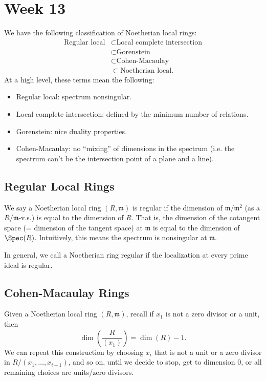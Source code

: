 \section{Week 13}
We have the following classification of Noetherian local rings:
\[
    \begin{split}
        \text{Regular local} & \subset \text{Local complete intersection} \\
                             & \subset \text{Gorenstein}                  \\
                             & \subset \text{Cohen-Macaulay}              \\
                             & \subset \text{Noetherian local}.
    \end{split}
\]
At a high level, these terms mean the following:
\begin{itemize}
    \item Regular local: spectrum nonsingular.
    \item Local complete intersection: defined by the minimum number of relations.
    \item Gorenstein: nice duality properties.
    \item Cohen-Macaulay: no ``mixing'' of dimensions in the spectrum (i.e. the spectrum can't be the intersection point of a plane and a line).
\end{itemize}

\subsection{Regular Local Rings}
We say a Noetherian local ring $(R, \mathfrak m)$ is regular if the dimension of $\mathfrak m/\mathfrak m^2$ (as a $R/\mathfrak m$-v.s.) is equal to the dimension of $R$. That is, the dimension of the cotangent space (= dimension of the tangent space) at $\mathfrak m$ is equal to the dimension of $\Spec(R)$. Intuitively, this means the spectrum is nonsingular at $\mathfrak m$.

In general, we call a Noetherian ring regular if the localization at every prime ideal is regular.

\subsection{Cohen-Macaulay Rings}
Given a Noetherian local ring $(R, \mathfrak m)$, recall if $x_1$ is not a zero divisor or a unit, then
\[
    \dim\left( \frac{R}{(x_1)} \right) = \dim(R) - 1.
\]
We can repeat this construction by choosing $x_i$ that is not a unit or a zero divisor in $R/(x_1,\dots,x_{i-1})$, and so on, until we decide to stop, get to dimension 0, or all remaining choices are units/zero divisors.

